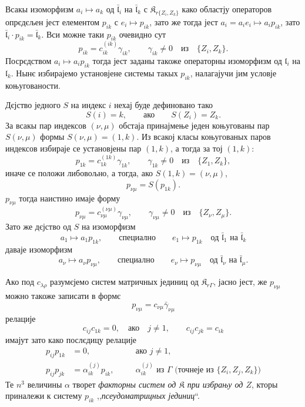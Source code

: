 \documentclass[11pt]{article}
\begin{document}
Всакы изоморфизм \(a_i\mapsto a_k\) од \(\bar{\mathfrak l}_i\) на \(\bar{\mathfrak l}_k\) с \(\mathfrak K_{r\{Z_i,Z_k\}}\) како областју операторов опрєдєљен јест елементом \(p_{ik}\) с \(e_i\mapsto p_{ik}\), зато же тогда јест \(a_i=a_ie_i\mapsto a_ip_{ik}\), зато \(\bar{\mathfrak l}_i\cdot p_{ik}=\bar{\mathfrak l}_k\). Вси можне таки \(p_{ik}\) очевидно сут
\[
p_{ik}=c_{ik}^{(ik)}\gamma_{ik},\qquad \gamma_{ik}\ne0\quad\text{из}\quad \{Z_i,Z_k\}.
\]
Посрєдством \(a_i\mapsto a_ip_{ik}\) тогда јест заданы такоже операторны изоморфизм од \(\mathfrak l_i\) на \(\mathfrak l_k\). Нынє избирајемо установјене системы такых \(p_{ik}\), налагајучи јим условје коњугованости.

Дєјство једного \(S\) на индекс \(i\) нехај буде дефиновано тако
\[
S(i)=k,\qquad\text{ако}\qquad S(Z_i)=Z_k.
\]
За всакы пар индексов \((\nu,\mu)\) обстаја принајмење једен коњугованы пар \(S(\nu,\mu)\) формы \(S(\nu,\mu)=(1,k)\). Из всакој класы коњугованых паров индексов избираје се установјены пар \((1,k)\), а тогда за тој \((1,k)\):
\[
p_{1k}=c_{1k}^{(1k)}\gamma_{1k},\qquad \gamma_{1k}\ne0\quad\text{из}\quad \{Z_1,Z_k\},
\]
иначе се положи либовољно, а тогда, ако \(S(1,k)=(\nu,\mu)\),
\[
p_{\nu\mu}=S(p_{1k}).
\]
\(p_{\nu\mu}\) тогда наистино имаје форму
\[
p_{\nu\mu}=c_{\nu\mu}^{(\nu\mu)}\gamma_{\nu\mu},\qquad
\gamma_{\nu\mu}\ne0\quad\text{из}\quad \{Z_\nu,Z_\mu\}.
\]
Зато же дєјство од \(S\) на изоморфизм
\[
a_1\mapsto a_1p_{1k},\qquad\text{специално}\qquad e_1\mapsto p_{1k}
\quad\text{од }\bar{\mathfrak l}_1\text{ на }\bar{\mathfrak l}_k
\]
даваје изоморфизм
\[
a_\nu\mapsto a_\nu p_{\nu\mu},\qquad\text{специално}\qquad e_\nu\mapsto p_{\nu\mu}
\quad\text{од }\bar{\mathfrak l}_\nu\text{ на }\bar{\mathfrak l}_\mu.
\]

Ако под \(c_{\lambda\rho}\) разумєјемо систем матричных јединиц од \(\mathfrak K_{r\Gamma}\), јасно јест, же \(p_{\nu\mu}\) можно такоже записати в формє
\[
p_{\nu\mu}=c_{\nu\mu}\bar\gamma_{\nu\mu}
\]
релације
\[
c_{ij}c_{1k}=0,\quad\text{ако}\quad j\ne1,
\qquad
c_{ij}c_{jk}=c_{ik}
\]
имајут зато како послєдицу релације
\[
\begin{aligned}
p_{ij}p_{1k}&=0,\quad &&\text{ако }j\ne1,\\
p_{ij}p_{jk}&=\alpha_{ik}^{(j)}p_{ik},\quad
&&\alpha_{ik}^{(j)}\text{ из }\Gamma\text{ (точнеје из }\{Z_i,Z_j,Z_k\}\text{)}
\end{aligned}
\]
Те \(n^3\) величины \(\alpha\) творет \emph{факторны систем од \(\mathfrak K\) при избрању од \(Z\)}, кторы приналежи к систему \(p_{ik}\) ,,\emph{псеудоматрицных јединиц}``.
\end{document}

